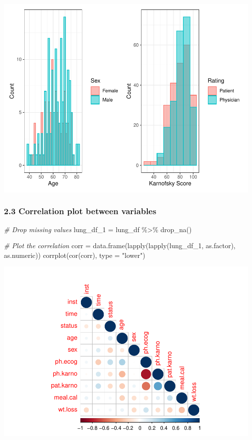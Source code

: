 \documentclass[
]{article}
\newenvironment{Shaded}{\begin{snugshade}}{\end{snugshade}}
\newcommand{\AttributeTok}[1]{\textcolor[rgb]{0.77,0.63,0.00}{#1}}
\newcommand{\CommentTok}[1]{\textcolor[rgb]{0.56,0.35,0.01}{\textit{#1}}}
\newcommand{\FunctionTok}[1]{\textcolor[rgb]{0.00,0.00,0.00}{#1}}
\newcommand{\NormalTok}[1]{#1}
\newcommand{\OtherTok}[1]{\textcolor[rgb]{0.56,0.35,0.01}{#1}}
\newcommand{\SpecialCharTok}[1]{\textcolor[rgb]{0.00,0.00,0.00}{#1}}
\newcommand{\StringTok}[1]{\textcolor[rgb]{0.31,0.60,0.02}{#1}}
\begin{document}
\includegraphics{final_project_files/figure-latex/unnamed-chunk-6-3.pdf}

\hypertarget{correlation-plot-between-variables}{%
\subsubsection{2.3 Correlation plot between
variables}\label{correlation-plot-between-variables}}

\begin{Shaded}
\begin{Highlighting}[]
\CommentTok{\# Drop missing values}
\NormalTok{lung\_df\_1 }\OtherTok{=}\NormalTok{ lung\_df }\SpecialCharTok{\%\textgreater{}\%}
  \FunctionTok{drop\_na}\NormalTok{()}

\CommentTok{\# Plot the correlation}
\NormalTok{corr }\OtherTok{=} \FunctionTok{data.frame}\NormalTok{(}\FunctionTok{lapply}\NormalTok{(}\FunctionTok{lapply}\NormalTok{(lung\_df\_1, as.factor), as.numeric))}
\FunctionTok{corrplot}\NormalTok{(}\FunctionTok{cor}\NormalTok{(corr), }\AttributeTok{type =} \StringTok{"lower"}\NormalTok{)}
\end{Highlighting}
\end{Shaded}

\includegraphics{final_project_files/figure-latex/unnamed-chunk-7-1.pdf}
\end{document}
